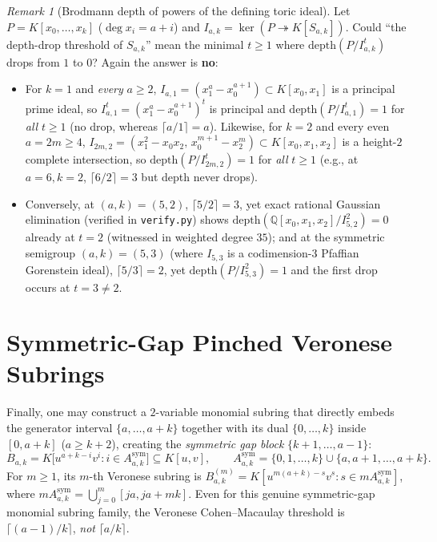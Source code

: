\documentclass[11pt]{amsart}
\theoremstyle{definition}
\theoremstyle{remark}
\newtheorem{remark}[theorem]{Remark}
\newcommand{\QQ}{\mathbb{Q}}
\newcommand{\depth}{\mathrm{depth}}
\begin{document}
\begin{remark}[Brodmann depth of powers of the defining toric ideal]
\label{rem:toric-powers}
Let $P = K[x_0, \dots, x_k]$ ($\deg x_i = a + i$) and $I_{a,k} = \ker(P \twoheadrightarrow K[S_{a,k}])$. Could ``the depth-drop threshold of $S_{a,k}$'' mean the minimal $t \ge 1$ where $\depth(P / I_{a,k}^t)$ drops from $1$ to $0$? Again the answer is \textbf{no}:
\begin{itemize}
  \item For $k = 1$ and \emph{every} $a \ge 2$, $I_{a,1} = (x_1^a - x_0^{a+1}) \subset K[x_0,x_1]$ is a principal prime ideal, so $I_{a,1}^t = (x_1^a - x_0^{a+1})^t$ is principal and $\depth(P / I_{a,1}^t) = 1$ for \emph{all} $t \ge 1$ (no drop, whereas $\lceil a/1 \rceil = a$). Likewise, for $k = 2$ and every even $a = 2m \ge 4$, $I_{2m,2} = (x_1^2 - x_0 x_2,\, x_0^{m+1} - x_2^m) \subset K[x_0,x_1,x_2]$ is a height-$2$ complete intersection, so $\depth(P / I_{2m,2}^t) = 1$ for \emph{all} $t \ge 1$ (e.g., at $a=6, k=2$, $\lceil 6/2 \rceil = 3$ but depth never drops).
  \item Conversely, at $(a,k) = (5,2)$, $\lceil 5/2 \rceil = 3$, yet exact rational Gaussian elimination (verified in \texttt{verify.py}) shows $\depth(\QQ[x_0,x_1,x_2] / I_{5,2}^2) = 0$ already at $t = 2$ (witnessed in weighted degree $35$); and at the symmetric semigroup $(a,k) = (5,3)$ (where $I_{5,3}$ is a codimension-$3$ Pfaffian Gorenstein ideal), $\lceil 5/3 \rceil = 2$, yet $\depth(P / I_{5,3}^2) = 1$ and the first drop occurs at $t = 3 \ne 2$.
\end{itemize}
\end{remark}

\section{Symmetric-Gap Pinched Veronese Subrings}
\label{sec:veronese}

Finally, one may construct a $2$-variable monomial subring that directly embeds the generator interval $\{a, \dots, a+k\}$ together with its dual $\{0, \dots, k\}$ inside $[0, a+k]$ ($a \ge k+2$), creating the \emph{symmetric gap block} $\{k+1, \dots, a-1\}$:
\[
  B_{a,k} = K\bigl[u^{a+k-i} v^i : i \in A^{\mathrm{sym}}_{a,k}\bigr] \subseteq K[u,v], \qquad A^{\mathrm{sym}}_{a,k} = \{0, 1, \dots, k\} \cup \{a, a+1, \dots, a+k\}.
\]
For $m \ge 1$, its $m$-th Veronese subring is $B_{a,k}^{(m)} = K[u^{m(a+k)-s} v^s : s \in m A^{\mathrm{sym}}_{a,k}]$, where $m A^{\mathrm{sym}}_{a,k} = \bigcup_{j=0}^m [ja, ja + mk]$. Even for this genuine symmetric-gap monomial subring family, the Veronese Cohen--Macaulay threshold is $\lceil (a-1)/k \rceil$, \emph{not} $\lceil a/k \rceil$.
\end{document}

